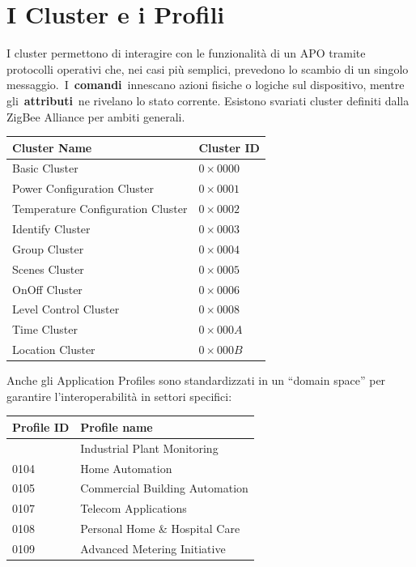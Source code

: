 \documentclass[
  italian,
  openany]{book}
\newcounter{none} %
\begin{document}
\section{I Cluster e i Profili}\label{i-cluster-e-i-profili}

I cluster permettono di interagire con le funzionalità di un APO tramite
protocolli operativi che, nei casi più semplici, prevedono lo scambio di
un singolo messaggio.~I~\textbf{comandi}~innescano azioni fisiche o
logiche sul dispositivo, mentre gli~\textbf{attributi}~ne rivelano lo
stato corrente. Esistono svariati cluster definiti dalla ZigBee Alliance
per ambiti generali.

{\def\LTcaptype{none} %
\begin{longtable}[]{@{}ll@{}}
\toprule\noalign{}
\textbf{Cluster Name} & \textbf{Cluster ID} \\
\midrule\noalign{}
\endhead
\bottomrule\noalign{}
\endlastfoot
Basic Cluster & \(0\times0000\) \\
Power Configuration Cluster & \(0\times0001\) \\
Temperature Configuration Cluster & \(0\times0002\) \\
Identify Cluster & \(0\times0003\) \\
Group Cluster & \(0\times0004\) \\
Scenes Cluster & \(0\times0005\) \\
OnOff Cluster & \(0\times0006\) \\
Level Control Cluster & \(0\times0008\) \\
Time Cluster & \(0\times000A\) \\
Location Cluster & \(0\times000B\) \\
\end{longtable}
}

Anche gli Application Profiles sono standardizzati in un ``domain
space'' per garantire l'interoperabilità in settori specifici:

{\def\LTcaptype{none} %
\begin{longtable}[]{@{}ll@{}}
\toprule\noalign{}
\textbf{Profile ID} & \textbf{Profile name} \\
\midrule\noalign{}
\endhead
\bottomrule\noalign{}
\endlastfoot
0101 & Industrial Plant Monitoring \\
0104 & Home Automation \\
0105 & Commercial Building Automation \\
0107 & Telecom Applications \\
0108 & Personal Home \& Hospital Care \\
0109 & Advanced Metering Initiative \\
\end{longtable}
}
\end{document}
